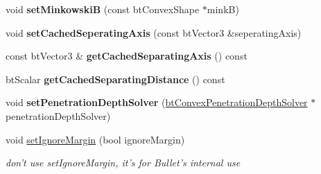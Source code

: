 \begin{DoxyCompactItemize}
\item 
\hypertarget{classbt_gjk_pair_detector_aee8fc2c182e482574ba9e819eea7b23a}{void {\bfseries set\+Minkowski\+B} (const bt\+Convex\+Shape $\ast$mink\+B)}\label{classbt_gjk_pair_detector_aee8fc2c182e482574ba9e819eea7b23a}

\item 
\hypertarget{classbt_gjk_pair_detector_ab7fa662834f692ae7ee3c08cc1f23cd0}{void {\bfseries set\+Cached\+Seperating\+Axis} (const bt\+Vector3 \&seperating\+Axis)}\label{classbt_gjk_pair_detector_ab7fa662834f692ae7ee3c08cc1f23cd0}

\item 
\hypertarget{classbt_gjk_pair_detector_a1a812a6b875660bc66de1a60bf6a76ab}{const bt\+Vector3 \& {\bfseries get\+Cached\+Separating\+Axis} () const }\label{classbt_gjk_pair_detector_a1a812a6b875660bc66de1a60bf6a76ab}

\item 
\hypertarget{classbt_gjk_pair_detector_ae27d863f35ce718af83c46a896e80fd6}{bt\+Scalar {\bfseries get\+Cached\+Separating\+Distance} () const }\label{classbt_gjk_pair_detector_ae27d863f35ce718af83c46a896e80fd6}

\item 
\hypertarget{classbt_gjk_pair_detector_a253d7d36f6ca288e41305682814c8c60}{void {\bfseries set\+Penetration\+Depth\+Solver} (\hyperlink{classbt_convex_penetration_depth_solver}{bt\+Convex\+Penetration\+Depth\+Solver} $\ast$penetration\+Depth\+Solver)}\label{classbt_gjk_pair_detector_a253d7d36f6ca288e41305682814c8c60}

\item 
\hypertarget{classbt_gjk_pair_detector_a93e9752920c57c39faca247fc005750e}{void \hyperlink{classbt_gjk_pair_detector_a93e9752920c57c39faca247fc005750e}{set\+Ignore\+Margin} (bool ignore\+Margin)}\label{classbt_gjk_pair_detector_a93e9752920c57c39faca247fc005750e}

\begin{DoxyCompactList}\small\item\em don't use set\+Ignore\+Margin, it's for Bullet's internal use \end{DoxyCompactList}\end{DoxyCompactItemize}
